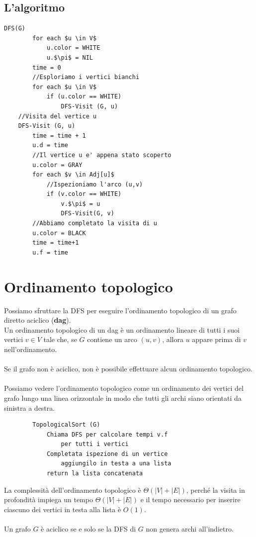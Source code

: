 \subsection{L'algoritmo}
    \begin{lstlisting}[caption = DFS]
    DFS(G)
        for each $u \in V$
            u.color = WHITE
            u.$\pi$ = NIL
        time = 0
        //Esploriamo i vertici bianchi
        for each $u \in V$
            if (u.color == WHITE)
                DFS-Visit (G, u)
    //Visita del vertice u
    DFS-Visit (G, u)
        time = time + 1
        u.d = time
        //Il vertice u e' appena stato scoperto
        u.color = GRAY
        for each $v \in Adj[u]$
            //Ispezioniamo l'arco (u,v)
            if (v.color == WHITE)
                v.$\pi$ = u
                DFS-Visit(G, v)
        //Abbiamo completato la visita di u
        u.color = BLACK
        time = time+1
        u.f = time
    \end{lstlisting}

\section{Ordinamento topologico}
Possiamo sfruttare la DFS per eseguire l'ordinamento topologico di un grafo diretto aciclico (\textbf{dag}).\\
Un ordinamento topologico di un dag è un ordinamento lineare di tutti i suoi vertici $v \in V$ tale che, se $G$ contiene un arco $(u,v)$, allora $u$ appare prima di $v$ nell'ordinamento.\\\\
Se il grafo non è aciclico, non è possibile effettuare alcun ordinamento topologico.\\\\
Possiamo vedere l'ordinamento topologico come un ordinamento dei vertici del grafo lungo una linea orizzontale in modo che tutti gli archi siano orientati da sinistra a destra.
    \begin{lstlisting}
        TopologicalSort (G)
            Chiama DFS per calcolare tempi v.f 
                per tutti i vertici
            Completata ispezione di un vertice
                aggiungilo in testa a una lista
            return la lista concatenata
    \end{lstlisting}
La complessità dell'ordinamento topologico è $\Theta(|V|+|E|)$, perché la visita in profondità impiega un tempo $\Theta(|V|+|E|)$ e il tempo necessario per inserire ciascuno dei vertici in testa alla lista è $O(1)$.\\\\
Un grafo $G$ è aciclico se e solo se la DFS di $G$ non genera archi all'indietro.

